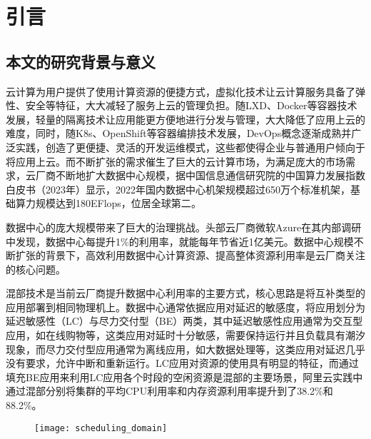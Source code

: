 \chapter{引言}\label{chap:introduction}

\section{本文的研究背景与意义}


云计算为用户提供了使用计算资源的便捷方式，虚拟化技术让云计算服务具备了弹性、安全等特征，大大减轻了服务上云的管理负担。随LXD、Docker等容器技术发展，轻量的隔离技术让应用能更方便地进行分发与管理，大大降低了应用上云的难度，同时，随K8s、OpenShift等容器编排技术发展，DevOps概念逐渐成熟并广泛实践，创造了更便捷、灵活的开发运维模式，这些都使得企业与普通用户倾向于将应用上云。而不断扩张的需求催生了巨大的云计算市场，为满足庞大的市场需求，云厂商不断地扩大数据中心规模，据中国信息通信研究院的中国算力发展指数白皮书（2023年）显示，2022年国内数据中心机架规模超过650万个标准机架，基础算力规模达到180EFlops，位居全球第二\citep{chinaict2023}。

数据中心的庞大规模带来了巨大的治理挑战。头部云厂商微软Azure在其内部调研中发现，数据中心每提升1\%的利用率，就能每年节省近1亿美元\citep{hadary2020protean}。数据中心规模不断扩张的背景下，高效利用数据中心计算资源、提高整体资源利用率是云厂商关注的核心问题。

混部技术是当前云厂商提升数据中心利用率的主要方式，核心思路是将互补类型的应用部署到相同物理机上。数据中心通常依据应用对延迟的敏感度，将应用划分为延迟敏感性（LC）与尽力交付型（BE）两类，其中延迟敏感性应用通常为交互型应用，如在线购物等，这类应用对延时十分敏感，需要保持运行并且负载具有潮汐现象，而尽力交付型应用通常为离线应用，如大数据处理等，这类应用对延迟几乎没有要求，允许中断和重新运行。LC应用对资源的使用具有明显的特征，而通过填充BE应用来利用LC应用各个时段的空闲资源是混部的主要场景，阿里云实践中通过混部分别将集群的平均CPU利用率和内存资源利用率提升到了38.2\%和88.2\%\citep{guo2019limits}。

\begin{figure}[!htbp]
    \centering
    \texttt{[image: scheduling\_domain]}
    \label{fig:scheduling_domain}
\end{figure}

